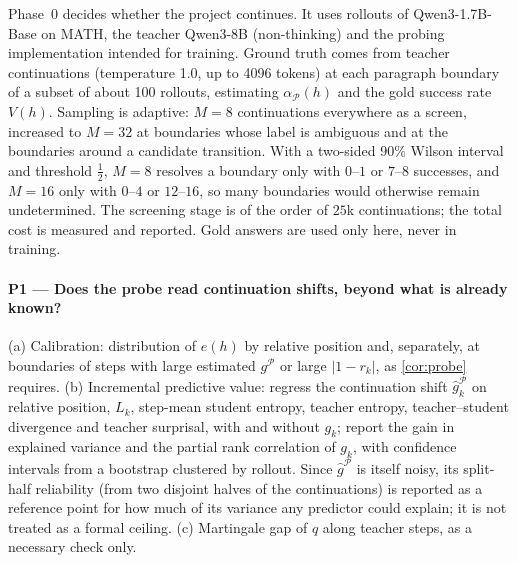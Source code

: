 \documentclass[11pt]{article}
\theoremstyle{definition}
\theoremstyle{remark}
\begin{document}
Phase~0 decides whether the project continues. It uses rollouts of Qwen3-1.7B-Base on MATH, the teacher Qwen3-8B (non-thinking) and the probing implementation intended for training. Ground truth comes from teacher continuations (temperature 1.0, up to 4096 tokens) at each paragraph boundary of a subset of about 100 rollouts, estimating $\alpha_{\mathcal P}(h)$ and the gold success rate $V(h)$. Sampling is adaptive: $M=8$ continuations everywhere as a screen, increased to $M=32$ at boundaries whose label is ambiguous and at the boundaries around a candidate transition. With a two-sided 90\% Wilson interval and threshold $\tfrac12$, $M=8$ resolves a boundary only with $0$--$1$ or $7$--$8$ successes, and $M=16$ only with $0$--$4$ or $12$--$16$, so many boundaries would otherwise remain undetermined. The screening stage is of the order of $25$k continuations; the total cost is measured and reported. Gold answers are used only here, never in training.

\paragraph{P1 --- Does the probe read continuation shifts, beyond what is already known?}
(a) Calibration: distribution of $e(h)$ by relative position and, separately, at boundaries of steps with large estimated $g^{\mathcal P}$ or large $\lvert1-r_k\rvert$, as \cref{cor:probe} requires. (b) Incremental predictive value: regress the continuation shift $\hat g^{\mathcal P}_k$ on relative position, $L_k$, step-mean student entropy, teacher entropy, teacher--student divergence and teacher surprisal, with and without $g_k$; report the gain in explained variance and the partial rank correlation of $g_k$, with confidence intervals from a bootstrap clustered by rollout. Since $\hat g^{\mathcal P}$ is itself noisy, its split-half reliability (from two disjoint halves of the continuations) is reported as a reference point for how much of its variance any predictor could explain; it is not treated as a formal ceiling. (c) Martingale gap of $q$ along teacher steps, as a necessary check only.
\end{document}
